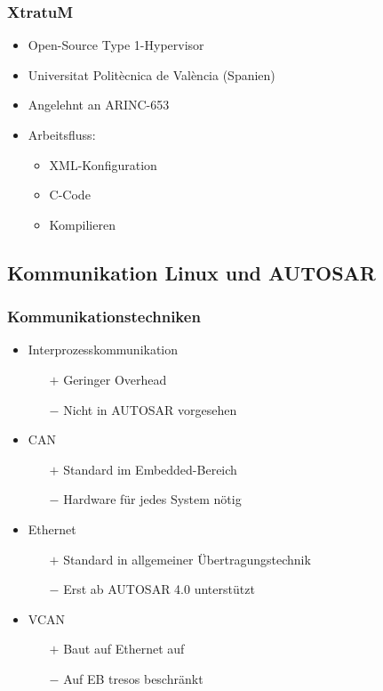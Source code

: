 \documentclass[]{beamer}
\begin{document}
\begin{frame}
\frametitle{XtratuM}
    \begin{itemize}
        \item Open-Source Type 1-Hypervisor
        \item Universitat Politècnica de València (Spanien)
        \item Angelehnt an ARINC-653
        \item Arbeitsfluss:
        \begin{itemize}
            \item XML-Konfiguration
            \item C-Code
            \item Kompilieren
        \end{itemize}
    \end{itemize}
\end{frame}


\subsection{Kommunikation Linux und AUTOSAR}
\begin{frame}
\frametitle{Kommunikationstechniken}

    \begin{itemize}
        \pause
        \item Interprozesskommunikation
        \begin{itemize}
            \item[$ + $] Geringer Overhead
            \item[$ - $] Nicht in AUTOSAR vorgesehen
        \end{itemize}
        \pause
        \item CAN
        \begin{itemize}
            \item[$ + $] Standard im Embedded-Bereich
            \item[$ - $] Hardware für jedes System nötig
        \end{itemize}
        \pause
        \item Ethernet
        \begin{itemize}
            \item[$ + $] Standard in allgemeiner Übertragungstechnik
            \item[$ - $] Erst ab AUTOSAR 4.0 unterstützt
        \end{itemize}
        \pause
        \item VCAN
        \begin{itemize}
            \item[$ + $] Baut auf Ethernet auf
            \item[$ - $] Auf EB tresos beschränkt
        \end{itemize}
    \end{itemize}

\end{frame}
\end{document}
